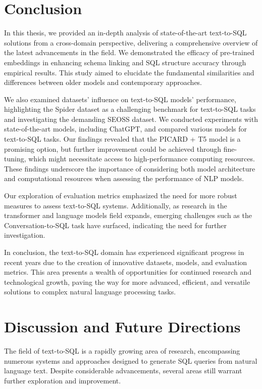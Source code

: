 \section{Conclusion}
In this thesis, we provided an in-depth analysis of state-of-the-art text-to-SQL solutions from a cross-domain perspective, delivering a comprehensive overview of the latest advancements in the field. We demonstrated the efficacy of pre-trained embeddings in enhancing schema linking and SQL structure accuracy through empirical results. This study aimed to elucidate the fundamental similarities and differences between older models and contemporary approaches.

We also examined datasets' influence on text-to-SQL models' performance, highlighting the Spider dataset as a challenging benchmark for text-to-SQL tasks and investigating the demanding SEOSS dataset. We conducted experiments with state-of-the-art models, including ChatGPT, and compared various models for text-to-SQL tasks. Our findings revealed that the PICARD + T5 model is a promising option, but further improvement could be achieved through fine-tuning, which might necessitate access to high-performance computing resources. These findings underscore the importance of considering both model architecture and computational resources when assessing the performance of NLP models.

Our exploration of evaluation metrics emphasized the need for more robust measures to assess text-to-SQL systems. Additionally, as research in the transformer and language models field expands, emerging challenges such as the Conversation-to-SQL task have surfaced, indicating the need for further investigation.

In conclusion, the text-to-SQL domain has experienced significant progress in recent years due to the creation of innovative datasets, models, and evaluation metrics. This area presents a wealth of opportunities for continued research and technological growth, paving the way for more advanced, efficient, and versatile solutions to complex natural language processing tasks.

\clearpage

\section{Discussion and Future Directions}

The field of text-to-SQL is a rapidly growing area of research, encompassing numerous systems and approaches designed to generate SQL queries from natural language text. Despite considerable advancements, several areas still warrant further exploration and improvement.

